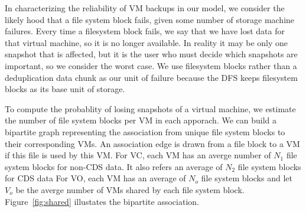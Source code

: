 


In characterizing the reliability of VM backups in our model, 
we consider the likely hood that a file system block fails,
given some number of storage machine failures. 
Every time a filesystem block fails,
we say that we have lost data for that virtual machine, so it is no longer
available. 
In reality it may be only one snapshot that is affected, but it is the user
who must decide which snapshots are important, so we consider the worst case. 
We use filesystem blocks rather than a deduplication
data chunk as our unit of failure because the DFS keeps
filesystem blocks as its base unit of storage.

To  compute the probablity of losing snapshots of a virtual machine, 
we estimate the number of file system blocks per VM in each apporach.
We can build a bipartite graph representing the association from unique file system blocks
to their corresponding VMs. An association edge is  drawn  from a file block  to a VM 
if this file is used by this VM. 
For VC, each VM has an 
averge number of $N_1$ file system blocks for non-CDS data. 
It also refers  an average of   $N_2$ file system blocks for CDS data 
For VO, each VM has an average  of  $N_o$ file system blocks
and let $V_o$ be the averge number of VMs shared by each file system block.
Figure~\ref{fig:shared} illustates the bipartite association.

